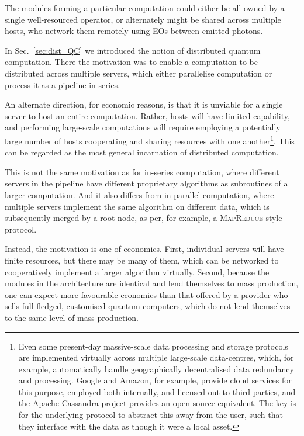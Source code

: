 The modules forming a particular computation could either be all owned by a single well-resourced operator, or alternately might be shared across multiple hosts, who network them remotely using EOs between emitted photons.

In Sec.~\ref{sec:dist_QC} we introduced the notion of distributed quantum computation. There the motivation was to enable a computation to be distributed across multiple servers, which either parallelise computation or process it as a pipeline in series.

An alternate direction, for economic reasons, is that it is unviable for a single server to host an entire computation. Rather, hosts will have limited capability, and performing large-scale computations will require employing a potentially large number of hosts cooperating and sharing resources with one another\footnote{Even some present-day massive-scale data processing and storage protocols are implemented virtually across multiple large-scale data-centres, which, for example, automatically handle geographically decentralised data redundancy and processing. Google and Amazon, for example, provide cloud services for this purpose, employed both internally, and licensed out to third parties, and the Apache Cassandra project provides an open-source equivalent. The key is for the underlying protocol to abstract this away from the user, such that they interface with the data as though it were a local asset.}. This can be regarded as the most general incarnation of distributed computation.

This is not the same motivation as for in-series computation, where different servers in the pipeline have different proprietary algorithms as subroutines of a larger computation. And it also differs from in-parallel computation, where multiple servers implement the same algorithm on different data, which is subsequently merged by a root node, as per, for example, a \textsc{MapReduce}-style protocol.

Instead, the motivation is one of economics. First, individual servers will have finite resources, but there may be many of them, which can be networked to cooperatively implement a larger algorithm virtually. Second, because the modules in the architecture are identical and lend themselves to mass production, one can expect more favourable economics than that offered by a provider who sells full-fledged, customised quantum computers, which do not lend themselves to the same level of mass production.

